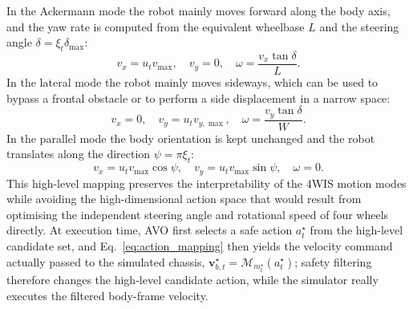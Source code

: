 \documentclass[10pt,a4paper,twocolumn]{article}
\begin{document}
In the Ackermann mode the robot mainly moves forward along the body axis, and the yaw rate is computed from the equivalent wheelbase $L$ and the steering angle $\delta=\xi_t\delta_{\max}$:
\begin{equation}
v_x=u_t v_{\max},\quad v_y=0,\quad
\omega=\frac{v_x\tan\delta}{L}.
\end{equation}
In the lateral mode the robot mainly moves sideways, which can be used to bypass a frontal obstacle or to perform a side displacement in a narrow space:
\begin{equation}
v_x=0,\quad v_y=u_t v_{y,\max},\quad
\omega=\frac{v_y\tan\delta}{W}.
\end{equation}
In the parallel mode the body orientation is kept unchanged and the robot translates along the direction $\psi=\pi\xi_t$:
\begin{equation}
v_x=u_t v_{\max}\cos\psi,\quad
v_y=u_t v_{\max}\sin\psi,\quad
\omega=0.
\end{equation}
This high-level mapping preserves the interpretability of the 4WIS motion modes while avoiding the high-dimensional action space that would result from optimising the independent steering angle and rotational speed of four wheels directly. At execution time, AVO first selects a safe action $a_t^{\star}$ from the high-level candidate set, and Eq.~\ref{eq:action_mapping} then yields the velocity command actually passed to the simulated chassis, $\mathbf v_{b,t}^{\star}=\mathcal M_{m_t^{\star}}(a_t^{\star})$; safety filtering therefore changes the high-level candidate action, while the simulator really executes the filtered body-frame velocity.

\begin{table}[H]
    \centering

    \caption{4WIS multimodal action interpretation}
    \label{tab:motion_modes}
    \scriptsize

\end{table}
\end{document}

